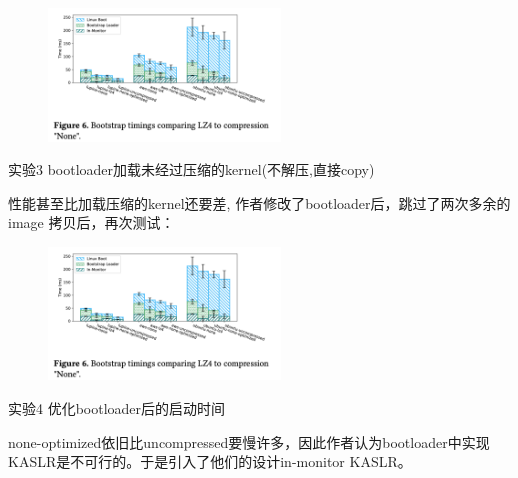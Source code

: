 \documentclass[
    aspectratio=169,  %
]{ctexbeamer}
\begin{document}
\begin{frame}

  \begin{figure}
  	\centering
  	\includegraphics[width=0.55\textwidth]{img/no_compress.png}
  \end{figure}
  
\begin{block}{实验3}
  bootloader加载未经过压缩的kernel(不解压,直接copy)
\end{block}

性能甚至比加载压缩的kernel还要差, 作者修改了bootloader后，跳过了两次多余的image 拷贝后，再次测试：
\end{frame}

\begin{frame}
  \begin{figure}
  	\centering
  	\includegraphics[width=0.55\textwidth]{img/no_compress.png}
  \end{figure}
\begin{block}{实验4}
  优化bootloader后的启动时间
\end{block}
  none-optimized依旧比uncompressed要慢许多，因此作者认为bootloader中实现KASLR是不可行的。于是引入了他们的设计in-monitor KASLR。
\end{frame}
\end{document}
